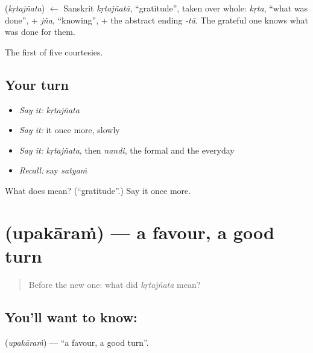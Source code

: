 \begin{cousinweb}
\textbf{} (\emph{kṛtajñata}) $\leftarrow$ Sanskrit \emph{kṛtajñatā}, \textquotedblleft{}gratitude\textquotedblright{}, taken over whole: \emph{kṛta}, \textquotedblleft{}what was done\textquotedblright{}, + \emph{jña}, \textquotedblleft{}knowing\textquotedblright{}, + the abstract ending \emph{-tā}. The grateful one knows what was done for them.
\end{cousinweb}

\begin{grammarlens}[title={What you've built}]
The first of five courtesies.
\end{grammarlens}

\subsection*{Your turn}
\begin{itemize}
\raggedright
  \item \emph{Say it:} \emph{kṛtajñata}
  \item \emph{Say it:} it once more, slowly
  \item \emph{Say it:} \emph{kṛtajñata}, then \emph{nandi}, the formal and the everyday
  \item \emph{Recall:} say \emph{satyaṁ}
\end{itemize}

\begin{tcolorbox}[breakable,colback=teal!4,colframe=teal!35!black,title={Before you move on}]
What does  mean? (\textquotedblleft{}gratitude\textquotedblright{}.) Say it once more.
\end{tcolorbox}
\section[\texorpdfstring{\ml{ഉപകാരം} (upakāraṁ)}{ഉപകാരം (upakāraṁ)}]{ (upakāraṁ) — a favour, a good turn}

\label{lesson:ML-C51-favour}



\begin{quote}
Before the new one: what did \emph{kṛtajñata} mean?
\end{quote}

\subsection*{You'll want to know: }
\textbf{} (\emph{upakāraṁ}) — \textquotedblleft{}a favour, a good turn\textquotedblright{}.

